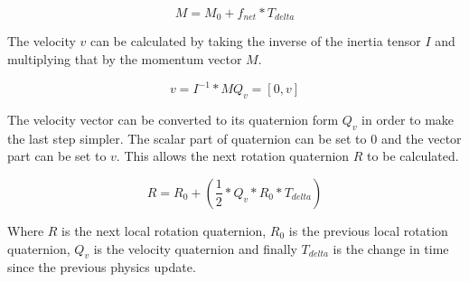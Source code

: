 \begin{equation}
M = M_0 + f_{net} * T_{delta}
\end{equation}

\noindent
The velocity $v$ can be calculated by taking the inverse of the inertia tensor $I$ and multiplying that by the momentum vector $M$.

\begin{equation}
v = I^{-1} * M
Q_v = [0, v]
\end{equation}

\noindent
The velocity vector can be converted to its quaternion form $Q_v$ in order to make the last step simpler. The scalar part of quaternion can be set to 0 and the vector part can be set to $v$. This allows the next rotation quaternion $R$ to be calculated. 

\begin{equation}
R = R_0 + (\frac{1}{2} * Q_v * R_0 * T_{delta})
\end{equation}

\noindent
Where $R$ is the next local rotation quaternion, $R_0$ is the previous local rotation quaternion, $Q_v$ is the velocity quaternion and finally $T_{delta}$ is the change in time since the previous physics update.

